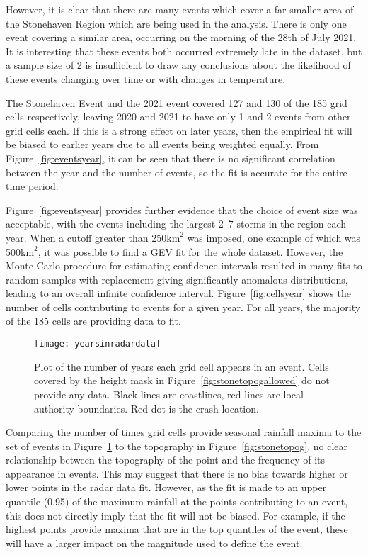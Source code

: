 However,
    it is clear that there are many events which cover a far smaller area of the Stonehaven Region which are being used in the analysis.
There is only one event covering a similar area,
    occurring on the morning of the 28th of July 2021.
It is interesting that these events both occurred extremely late in the dataset,
    but a sample size of 2 is insufficient to draw any conclusions about the likelihood of these events changing over time or with changes in temperature.

The Stonehaven Event and the 2021 event covered 127 and 130 of the 185 grid cells respectively,
    leaving 2020 and 2021 to have only 1 and 2 events from other grid cells each.
If this is a strong effect on later years,
    then the empirical fit will be biased to earlier years due to all events being weighted equally.
From Figure~\ref{fig:eventsyear}, it can be seen that there is no significant correlation between the
    year and the number of events, so the fit is accurate for the entire time period.

Figure~\ref{fig:eventsyear} provides further evidence that the choice of event size
    was acceptable,
    with the events including the largest 2--7 storms in the region each year.
When a cutoff greater than 250$\text{km}^2$ was imposed,
    one example of which was 500$\text{km}^2$,
    it was possible to find a GEV fit for the whole dataset.
However,
    the Monte Carlo procedure for estimating confidence intervals resulted in many fits
    to random samples with replacement giving significantly anomalous distributions,
    leading to an overall infinite confidence interval.
Figure~\ref{fig:cellsyear} shows the number of cells contributing to events for a given year.
For all years, the majority of the 185 cells are providing data to fit.

\begin{figure}[H]
    \centering
    \texttt{[image: yearsinradardata]}
    \caption[Plot of the number of years each grid cell appears in an event.]{
        Plot of the number of years each grid cell appears in an event.
    Cells covered by the height mask in Figure~\ref{fig:stonetopogallowed}
        do not provide any data.
    Black lines are coastlines, red lines are local authority boundaries.
    Red dot is the crash location.}
    \label{fig:yearsinradardata}
\end{figure}

Comparing the number of times grid cells provide seasonal rainfall maxima to the set of events
    in Figure~\ref{fig:yearsinradardata} to the topography in Figure~\ref{fig:stonetopog},
    no clear relationship between the topography of the point and the frequency of its appearance in events.
This may suggest that there is no bias towards higher or lower points in the radar data fit.
However,
    as the fit is made to an upper quantile (0.95) of the maximum rainfall at the points contributing to an event,
    this does not directly imply that the fit will not be biased.
For example, if the highest points provide maxima that are in the top quantiles of the event,
    these will have a larger impact on the magnitude used to define the event.

